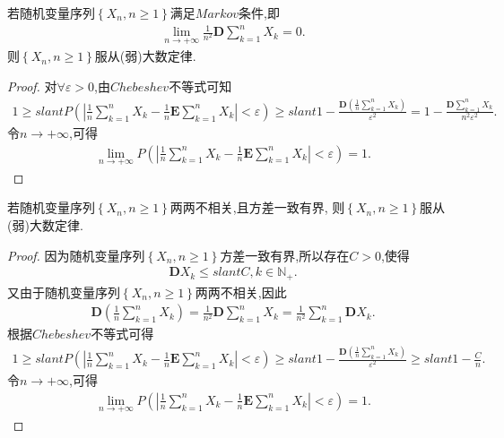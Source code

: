 \documentclass[lang=cn,newtx,10pt,scheme=chinese]{../../Template/elegantbook}
\begin{document}
\begin{theorem}[Markov大数定律]\label{theorem:Markov大数定律}
    若随机变量序列$\left\{ X_n,n\ge 1 \right\}$满足$Markov$条件,即
    \begin{align*}
        \underset{n\rightarrow +\infty}{\lim}\frac{1}{n^2}\boldsymbol{D}\sum_{k=1}^n{X_k}=0.
    \end{align*}
    则$\left\{ X_n,n\ge 1 \right\}$服从(弱)大数定律.
\end{theorem}
\begin{proof}
    对$\forall \varepsilon>0$,由$Chebeshev$不等式可知
    \begin{align*}
        1\geqslant slant P\left( \left| \frac{1}{n}\sum_{k=1}^n{X_k}-\frac{1}{n}\boldsymbol{E}\sum\limits_{k=1}^n{X_k} \right|<\varepsilon \right) \geqslant slant 1-\frac{\boldsymbol{D}\left( \frac{1}{n}\sum\limits_{k=1}^n{X_k} \right)}{\varepsilon ^2}=1-\frac{\boldsymbol{D}\sum\limits_{k=1}^n{X_k}}{n^2\varepsilon ^2}.
    \end{align*}
    令$n\to +\infty$,可得
    \begin{align*}
        \underset{n\rightarrow +\infty}{\lim}P\left( \left| \frac{1}{n}\sum_{k=1}^n{X_k}-\frac{1}{n}\boldsymbol{E}\sum_{k=1}^n{X_k} \right|<\varepsilon \right) =1.
    \end{align*}
\end{proof}

\begin{theorem}[Chebeshev大数定律]\label{theorem:Chebeshev大数定律}
    若随机变量序列$\left\{ X_n,n\ge 1 \right\}$两两不相关,且方差一致有界,
    则$\left\{ X_n,n\ge 1 \right\}$服从(弱)大数定律.
\end{theorem}
\begin{proof}
    因为随机变量序列$\left\{ X_n,n\ge 1 \right\}$方差一致有界,所以存在$C>0$,使得
    \begin{align*}
        \boldsymbol{D}X_k\leqslant slant C,k\in \mathbb{N}_+.
    \end{align*}
    又由于随机变量序列$\left\{ X_n,n\ge 1 \right\}$两两不相关,因此
    \begin{align*}
        \boldsymbol{D}\left( \frac{1}{n}\sum_{k=1}^n{X_k} \right) =\frac{1}{n^2}\boldsymbol{D}\sum_{k=1}^n{X_k}=\frac{1}{n^2}\sum_{k=1}^n{\boldsymbol{D}X_k}.
    \end{align*}
    根据$Chebeshev$不等式可得
    \begin{align*}
        1\geqslant slant P\left( \left| \frac{1}{n}\sum_{k=1}^n{X_k}-\frac{1}{n}\boldsymbol{E}\sum_{k=1}^n{X_k} \right|<\varepsilon \right) \geqslant slant 1-\frac{\boldsymbol{D}\left( \frac{1}{n}\sum\limits_{k=1}^n{X_k} \right)}{\varepsilon ^2}\geqslant slant 1-\frac{C}{n}.
    \end{align*}
    令$n\to +\infty$,可得
    \begin{align*}
        \underset{n\rightarrow +\infty}{\lim}P\left( \left| \frac{1}{n}\sum_{k=1}^n{X_k}-\frac{1}{n}\boldsymbol{E}\sum_{k=1}^n{X_k} \right|<\varepsilon \right) =1.
    \end{align*}
\end{proof}
\end{document}
